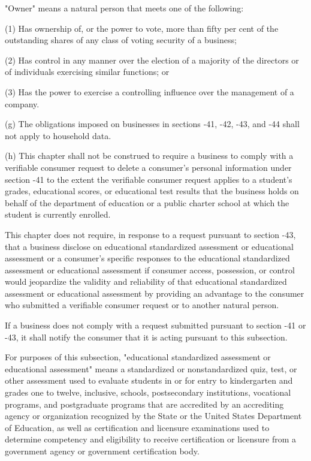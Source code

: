      "Owner" means a natural person that meets one of the following:

     (1)  Has ownership of, or the power to vote, more than fifty per cent of the outstanding shares of any class of voting security of a business;

     (2)  Has control in any manner over the election of a majority of the directors or of individuals exercising similar functions; or

     (3)  Has the power to exercise a controlling influence over the management of a company.

     (g)  The obligations imposed on businesses in sections    ‑41,    -42,    -43, and    -44 shall not apply to household data.

     (h)  This chapter shall not be construed to require a business to comply with a verifiable consumer request to delete a consumer's personal information under section    -41 to the extent the verifiable consumer request applies to a student's grades, educational scores, or educational test results that the business holds on behalf of the department of education or a public charter school at which the student is currently enrolled.

     This chapter does not require, in response to a request pursuant to section    -43, that a business disclose on educational standardized assessment or educational assessment or a consumer's specific responses to the educational standardized assessment or educational assessment if consumer access, possession, or control would jeopardize the validity and reliability of that educational standardized assessment or educational assessment by providing an advantage to the consumer who submitted a verifiable consumer request or to another natural person.

     If a business does not comply with a request submitted pursuant to section    -41 or    -43, it shall notify the consumer that it is acting pursuant to this subsection.

     For purposes of this subsection, "educational standardized assessment or educational assessment" means a standardized or nonstandardized quiz, test, or other assessment used to evaluate students in or for entry to kindergarten and grades one to twelve, inclusive, schools, postsecondary institutions, vocational programs, and postgraduate programs that are accredited by an accrediting agency or organization recognized by the State or the United States Department of Education, as well as certification and licensure examinations used to determine competency and eligibility to receive certification or licensure from a government agency or government certification body.

